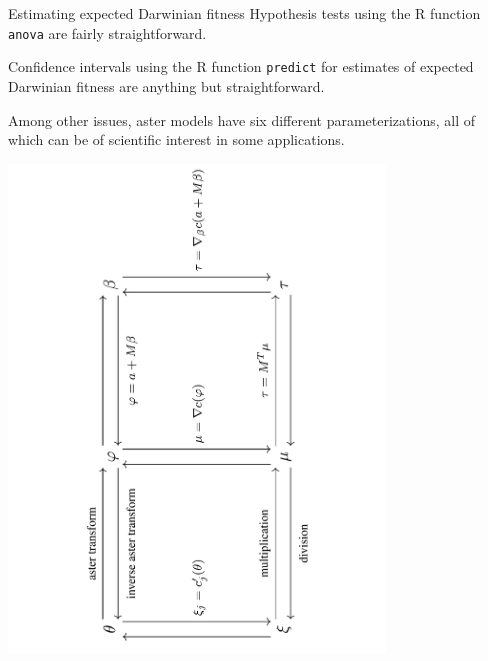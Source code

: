 \documentclass[
  ignorenonframetext,
]{beamer}
\begin{document}
\begin{frame}{Estimating expected Darwinian fitness}
\protect\hypertarget{estimating-expected-darwinian-fitness}{}
Hypothesis tests using the R function \texttt{anova} are fairly
straightforward.

Confidence intervals using the R function \texttt{predict} for estimates
of expected Darwinian fitness are anything but straightforward.

Among other issues, aster models have six different parameterizations,
all of which can be of scientific interest in some applications.
\end{frame}

\begin{frame}{}
\protect\hypertarget{section-26}{}
\begin{center}
\includegraphics[angle=270, width=0.75\textwidth]{transforms.pdf}
\end{center}
\end{frame}
\end{document}
